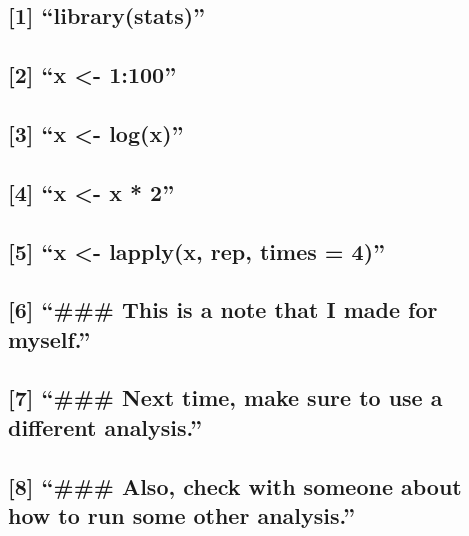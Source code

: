 \documentclass[]{article}
\begin{document}
\subsection{\texorpdfstring{{[}1{]}
``library(stats)''}{{[}1{]} library(stats)}}\label{librarystats}

\subsection{\texorpdfstring{{[}2{]} ``x \textless{}-
1:100''}{{[}2{]} x \textless{}- 1:100}}\label{x---1100}

\subsection{\texorpdfstring{{[}3{]} ``x \textless{}-
log(x)''}{{[}3{]} x \textless{}- log(x)}}\label{x---logx}

\subsection{\texorpdfstring{{[}4{]} ``x \textless{}- x *
2''}{{[}4{]} x \textless{}- x * 2}}\label{x---x-2}

\subsection{\texorpdfstring{{[}5{]} ``x \textless{}- lapply(x, rep,
times =
4)''}{{[}5{]} x \textless{}- lapply(x, rep, times = 4)}}\label{x---lapplyx-rep-times-4}

\subsection{\texorpdfstring{{[}6{]} ``\#\#\# This is a note that I made
for
myself.''}{{[}6{]} \#\#\# This is a note that I made for myself.}}\label{this-is-a-note-that-i-made-for-myself.}

\subsection{\texorpdfstring{{[}7{]} ``\#\#\# Next time, make sure to use
a different
analysis.''}{{[}7{]} \#\#\# Next time, make sure to use a different analysis.}}\label{next-time-make-sure-to-use-a-different-analysis.}

\subsection{\texorpdfstring{{[}8{]} ``\#\#\# Also, check with someone
about how to run some other
analysis.''}{{[}8{]} \#\#\# Also, check with someone about how to run some other analysis.}}\label{also-check-with-someone-about-how-to-run-some-other-analysis.}
\end{document}
